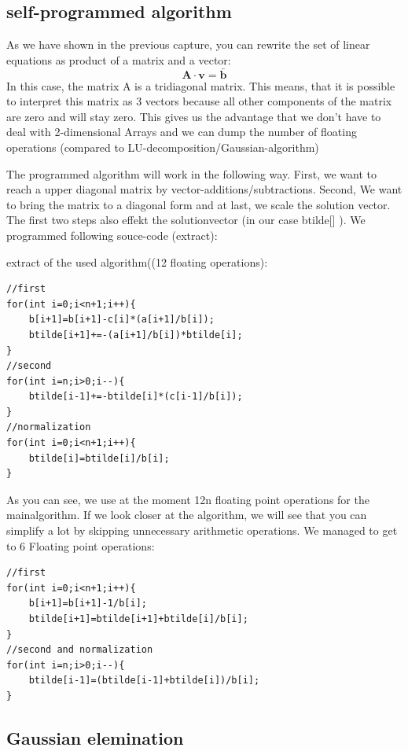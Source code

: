 \documentclass[10pt,a4paper]{article}
\begin{document}
\subsection{self-programmed algorithm }

As we have shown in the previous capture, you can rewrite the set of linear equations as product of a matrix and a vector:
\begin{equation}
	\mathbf{A \cdot v}=\bar{\mathbf{b}}
\end{equation}
In this case, the matrix A is a tridiagonal matrix. This means, that it is possible to interpret this matrix as 3 vectors because all other components of the matrix are zero and will stay zero. This gives us the advantage that we don't have to deal with 2-dimensional Arrays and we can dump the number of floating operations (compared to LU-decomposition/Gaussian-algorithm)

The programmed algorithm will work in the following way. First, we want to reach a upper diagonal matrix by vector-additions/subtractions. Second, We want to bring the matrix to a diagonal form and at last, we scale the solution vector. The first two steps also effekt the solutionvector (in our case btilde[] ). We programmed following souce-code (extract):

extract of the used algorithm((12 floating operations):
\begin{lstlisting}
//first
for(int i=0;i<n+1;i++){
	b[i+1]=b[i+1]-c[i]*(a[i+1]/b[i]);
	btilde[i+1]+=-(a[i+1]/b[i])*btilde[i];
}
//second
for(int i=n;i>0;i--){
	btilde[i-1]+=-btilde[i]*(c[i-1]/b[i]);
}
//normalization
for(int i=0;i<n+1;i++){
	btilde[i]=btilde[i]/b[i];
}
\end{lstlisting}
	
	
As you can see, we use at the moment 12n floating point operations for the mainalgorithm. If we look closer at the algorithm, we will see that you can simplify a lot by skipping unnecessary arithmetic operations. 
We managed to get to 6 Floating point operations:
\begin{lstlisting}
//first
for(int i=0;i<n+1;i++){
	b[i+1]=b[i+1]-1/b[i];
	btilde[i+1]=btilde[i+1]+btilde[i]/b[i];
}
//second and normalization
for(int i=n;i>0;i--){
	btilde[i-1]=(btilde[i-1]+btilde[i])/b[i];	
}
\end{lstlisting}
	
\subsection{Gaussian elemination}
\end{document}
